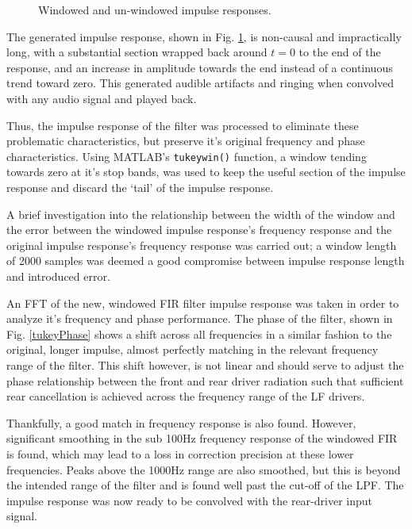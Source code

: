 \documentclass{report}
\begin{document}
\begin{figure}[H]
\begin{minipage}{.49\textwidth}
                    \caption{Windowed and un-windowed impulse responses.}
                    \label{tukeyImpulse}
                \end{minipage}
            \end{figure}

            The generated impulse response, shown in Fig. \ref{tukeyImpulse}, is non-causal and impractically long, with a substantial section wrapped back around $t=0$ to the end of the response, and an increase in amplitude towards the end instead of a continuous trend toward zero.
            This generated audible artifacts and ringing when convolved with any audio signal and played back.

            Thus, the impulse response of the filter was processed to eliminate these problematic characteristics, but preserve it's original frequency and phase characteristics.
            Using MATLAB's \texttt{tukeywin()} function, a window tending towards zero at it's stop bands, was used to keep the useful section of the impulse response and discard the `tail' of the impulse response.

            A brief investigation into the relationship between the width of the window and the error between the windowed impulse response's frequency response and the original impulse response's frequency response was carried out; a window length of 2000 samples was deemed a good compromise between impulse response length and introduced error.

            An FFT of the new, windowed FIR filter impulse response was taken in order to analyze it's frequency and phase performance.
            The phase of the filter, shown in Fig. \ref{tukeyPhase} shows a shift across all frequencies in a similar fashion to the original, longer impulse, almost perfectly matching in the relevant frequency range of the filter.
            This shift however, is not linear and should serve to adjust the phase relationship between the front and rear driver radiation such that sufficient rear cancellation is achieved across the frequency range of the LF drivers.

            Thankfully, a good match in frequency response is also found.
            However, significant smoothing in the sub 100Hz frequency response of the windowed FIR is found, which may lead to a loss in correction precision at these lower frequencies.
            Peaks above the 1000Hz range are also smoothed, but this is beyond the intended range of the filter and is found well past the cut-off of the LPF.
            The impulse response was now ready to be convolved with the rear-driver input signal.
            
\end{document}
